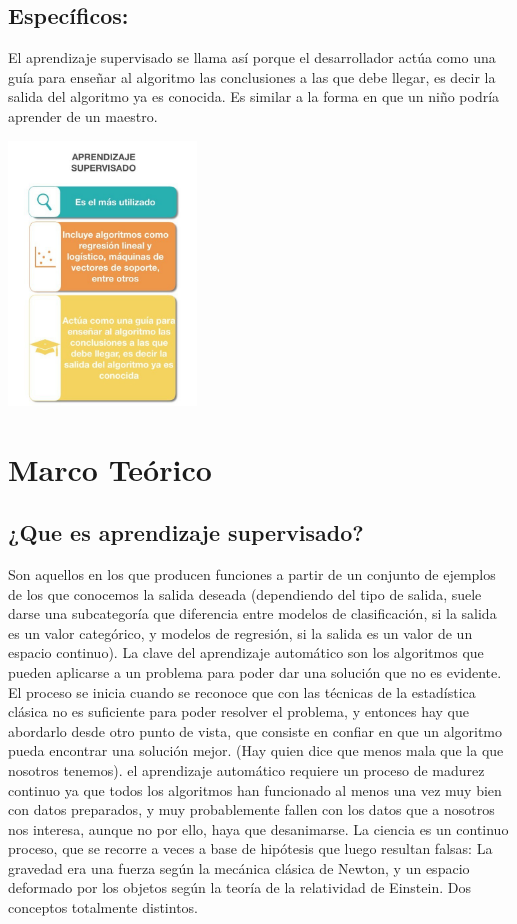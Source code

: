 \documentclass[%
 reprint,
 amsmath,amssymb,
 aps,
]{revtex4-1}
\begin{document}
\subsection{Específicos:}
El aprendizaje supervisado se llama así porque el desarrollador actúa como una guía para enseñar al algoritmo las conclusiones a las que debe llegar, es decir la salida del algoritmo ya es conocida. Es similar a la forma en que un niño podría aprender de un maestro.
 \begin{center}
\includegraphics[width=5cm]{./Imagenes/objetivoprincipal}
\end{center}


\section {Marco Teórico}

\subsection{¿Que es aprendizaje supervisado?}	
 Son aquellos en los que producen funciones a partir de un conjunto de ejemplos de los que conocemos la salida deseada (dependiendo del tipo de salida, suele darse una subcategoría que diferencia entre modelos de clasificación, si la salida es un valor categórico, y modelos de regresión, si la salida es un valor de un espacio continuo).
La clave del aprendizaje automático son los algoritmos que pueden aplicarse a un
problema para poder dar una solución que no es evidente. El proceso se inicia cuando se reconoce
que con las técnicas de la estadística clásica no es suficiente para poder resolver el problema, y
entonces hay que abordarlo desde otro punto de vista, que consiste en confiar en que un algoritmo
pueda encontrar una solución mejor. (Hay quien dice que menos mala que la que nosotros tenemos).
el aprendizaje automático requiere un proceso de madurez continuo ya que todos
los algoritmos han funcionado al menos una vez muy bien con datos preparados, y muy
probablemente fallen con los datos que a nosotros nos interesa, aunque no por ello, haya que
desanimarse. La ciencia es un continuo proceso, que se recorre a veces a base de hipótesis que luego
resultan falsas: La gravedad era una fuerza según la mecánica clásica de Newton, y un espacio
deformado por los objetos según la teoría de la relatividad de Einstein. Dos conceptos totalmente
distintos.
\end{document}
